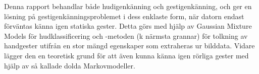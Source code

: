 \documentclass[../rapport_MVEX01-11-05]{subfiles}
\begin{document}
Denna rapport behandlar både hudigenkänning och gestigenkänning, och ger en
lösning på gestigenkänningsproblemet i dess enklaste form, när
datorn endast förväntas känna igen statiska gester. Detta görs med hjälp av
Gaussian Mixture Models för hudklassificering och \knn-metoden (k
närmsta grannar) för tolkning
av handgester utifrån en stor mängd egenskaper som extraheras ur bilddata.
Vidare lägger den en
teoretisk grund för att även kunna känna igen rörliga gester med hjälp av
så kallade dolda Markovmodeller.
\end{document}
